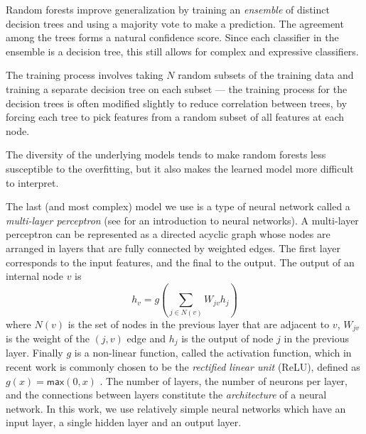 %
%

%
Random forests improve generalization by training an
\emph{ensemble} of distinct decision trees and using a majority
vote to make a prediction.
%
The agreement among the trees forms a natural
confidence score.
%
Since each classifier in the ensemble is a decision tree, this still
allows for complex and expressive classifiers.

%
%
The training process involves taking $N$ random subsets of the training
data and training a separate decision tree on each subset --- the
training process for the decision trees is often modified slightly to
reduce correlation between trees, by forcing each tree to pick features
from a random subset of all features at each node.
%

The diversity of the underlying models tends to make random forests less
susceptible to the overfitting, but it
also makes the learned model more difficult to interpret.
%


%
The last (and most complex) model we use is a type of neural network
called a \emph{multi-layer perceptron} (see \citealt{Nielsen2015-pu} for
an introduction to neural networks).
%
A multi-layer perceptron can be represented as a directed acyclic
graph whose nodes are arranged in layers that are fully connected by
weighted edges.
%
The first layer corresponds to the input features, and the final to the
output.
%
The output of an internal node $v$ is
%
\[ h_v = g(\sum_{j \in N(v)} W_{jv} h_j ) \]
%
where $N(v)$ is the set of nodes in the previous layer that are adjacent
to $v$, $W_{jv}$ is the weight of the $(j, v)$ edge and $h_j$ is the
output of node $j$ in the previous layer.
%
Finally $g$ is a non-linear function, called the activation function,
which in recent work is commonly chosen to be the \emph{rectified linear
  unit} (ReLU), defined as $g(x) = \mathsf{max}(0,x)$
\citep{Nair2010-xg}.
%
The number of layers, the number of neurons per layer, and the
connections between layers constitute the \emph{architecture} of a
neural network.
%
In this work, we use relatively simple neural networks which have an
input layer, a single hidden layer and an output layer.

